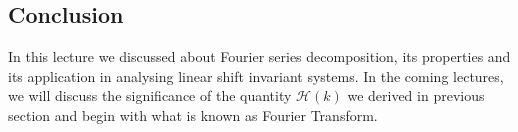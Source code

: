 \subsection {Conclusion} In this lecture we discussed about Fourier series decomposition, its properties and its application in analysing linear shift invariant systems. In the coming lectures, we will discuss the significance of the quantity $\mathcal{H}(k)$ we derived in previous section and begin with what is known as Fourier Transform.






